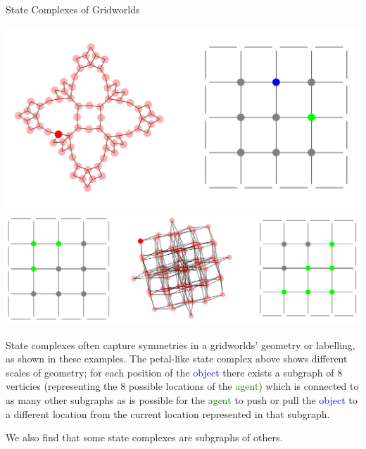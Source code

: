 \documentclass[
    a0paper, %
    portrait, %
    fontscale=0.4 %
    ]{baposter}
\begin{document}
\begin{poster}
\begin{posterbox}[
    name = scgrid,  %
    column = 1, %
    span = 2,
    below = sc %
    ]{State Complexes of Gridworlds}
\begin{minipage}{0.3\textwidth}
\includegraphics[width=\textwidth]{petal-walk-1.PNG}
\includegraphics[width=\textwidth]{3-6-agents.PNG}
\end{minipage} \hfill
\begin{minipage}{0.3\textwidth}
State complexes often capture symmetries in a gridworlds' geometry or labelling, as shown in these examples. The petal-like state complex above shows different scales of geometry; for each position of the \textcolor{blue}{object} there exists a subgraph of 8 verticies (representing the 8 possible locations of the \textcolor{green}{agent}) which is connected to as many other subgraphs as is possible for the \textcolor{green}{agent} to push or pull the \textcolor{blue}{object} to a different location from the current location represented in that subgraph.

\end{minipage} \hfill
\begin{minipage}{0.3\textwidth}
We also find that some state complexes are subgraphs of others.


\end{minipage}
\end{posterbox}
\end{poster}
\end{document}

